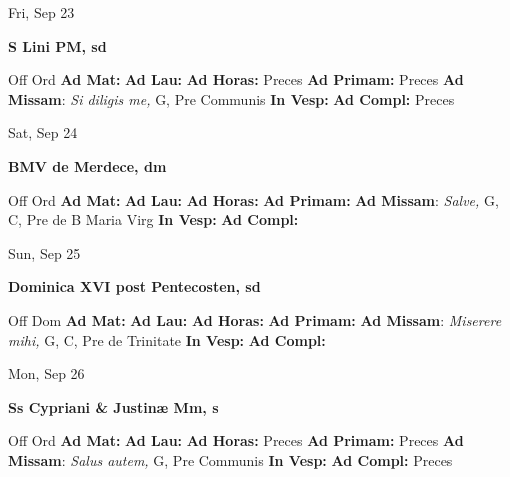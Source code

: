 \documentclass[10pt]{article}
\begin{document}
\begin{minipage}{3.5in}
\vspace{2em}\begin{center}
Fri, Sep 23
\end{center}\textbf{ \large S Lini PM, \textnormal{\normalsize sd}}
\begin{justify}
Off Ord
\textbf{Ad Mat: }
\textbf{Ad Lau: }
\textbf{Ad Horas: }Preces
\textbf{Ad Primam: }Preces
\textbf{Ad Missam}: \textit{Si diligis me,} G, Pre Communis
\textbf{In Vesp: }
\textbf{Ad Compl: }Preces\end{justify}
\end{minipage}



\begin{minipage}{3.5in}
\vspace{2em}\begin{center}
Sat, Sep 24
\end{center}\textbf{ \large BMV de Merdece, \textnormal{\normalsize dm}}
\begin{justify}
Off Ord
\textbf{Ad Mat: }
\textbf{Ad Lau: }
\textbf{Ad Horas: }
\textbf{Ad Primam: }
\textbf{Ad Missam}: \textit{Salve,} G, C, Pre de B Maria Virg
\textbf{In Vesp: }
\textbf{Ad Compl: }\end{justify}
\end{minipage}



\begin{minipage}{3.5in}
\vspace{2em}\begin{center}
Sun, Sep 25
\end{center}\textbf{ \large Dominica XVI post Pentecosten, \textnormal{\normalsize sd}}
\begin{justify}
Off Dom
\textbf{Ad Mat: }
\textbf{Ad Lau: }
\textbf{Ad Horas: }
\textbf{Ad Primam: }
\textbf{Ad Missam}: \textit{Miserere mihi,} G, C, Pre de Trinitate
\textbf{In Vesp: }
\textbf{Ad Compl: }\end{justify}
\end{minipage}



\begin{minipage}{3.5in}
\vspace{2em}\begin{center}
Mon, Sep 26
\end{center}\textbf{ \large Ss Cypriani \& Justinæ Mm, \textnormal{\normalsize s}}
\begin{justify}
Off Ord
\textbf{Ad Mat: }
\textbf{Ad Lau: }
\textbf{Ad Horas: }Preces
\textbf{Ad Primam: }Preces
\textbf{Ad Missam}: \textit{Salus autem,} G, Pre Communis
\textbf{In Vesp: }
\textbf{Ad Compl: }Preces\end{justify}
\end{minipage}
\end{document}
